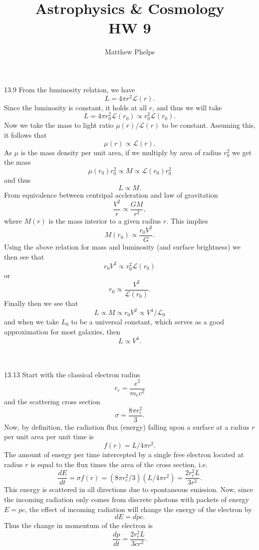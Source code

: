 \documentclass[10pt,letterpaper]{article}
\title{Astrophysics \& Cosmology\\HW 9}
\author{Matthew Phelps}
\date{}
\begin{document}
\maketitle

\benum

\item[13.9]
From the luminosity relation, we have
\[
	L = 4\pi r^2 \mathscr L(r).
\]
Since the luminosity is constant, it holds at all $r$, and thus we will take
\[
	L = 4\pi r_0^2 \mathscr L(r_0)\propto r_0^2 \mathscr L(r_0).
\]
Now we take the mass to light ratio $\mu(r)/\mathscr L(r)$ to be constant. Assuming this, it follows that
\[
	\mu(r) \propto \mathscr L(r).
\]
As $\mu$ is the mass density per unit area, if we multiply by area of radius $r_0^2$ we get the mass
\[
	\mu(r_0)r_0^2 \propto M \propto \mathscr L(r_0)r_0^2
\]
and thus
\[
	L \propto M.
\]
From equivalence between centripal accleration and law of gravitation
\[
	\frac{V^2}{r} \propto \frac{GM}{r^2},
\]
where $M(r)$ is the mass interior to a given radius $r$. This implies
\[
	M(r_0) \propto \frac{r_0V^2}{G}.
\]
Using the above relation for mass and luminosity (and surface brightness) we then see that
\[
	r_0 V^2 \propto r_0^2 \mathscr L(r_0)
\]
or
\[
	r_0\propto \frac{V^2}{\mathscr L(r_0)}.
\]
Finally then we see that
\[
	L\propto M \propto r_0V^2 \propto V^4/\mathscr L_0
\]
and when we take $L_0$ to be a universal constant, which serves as a good approximation for most galaxies, then 
\[
	L\propto V^4.
\]
\\ \\
\item[13.13]
Start with the classical electron radius
\[
	r_e = \frac{e^2}{m_e c^2}
\]
and the scattering cross section
\[
	\sigma = \frac{8\pi r_e^2}{3}.
\]
Now, by definition, the radiation flux (energy) falling upon a surface at a radius $r$ per unit area per unit time is
\[
	f(r) = L/4\pi r^2.
\]
The amount of energy per time intercepted by a single free electron located at radius $r$ is equal to the flux times the area of the cross section, i.e.
\[
	\frac{dE}{dt} = \sigma f(r) = (8\pi r_e^2/3)(L/4\pi r^2) = \frac{ 2r_e^2 L}{3r^2}.
\]
This energy is scattered in all directions due to spontaneous emission. Now, since the incoming radiation only comes from discrete photons with packets of energy $E = pc$, the effect of incoming radiation will change the energy of the electron by
\[
	dE = dp c.
\]
Thus the change in momentum of the electron is 
\[
	\frac{dp}{dt} = \frac{ 2r_e^2 L}{3cr^2}.
\]
\end{document}
